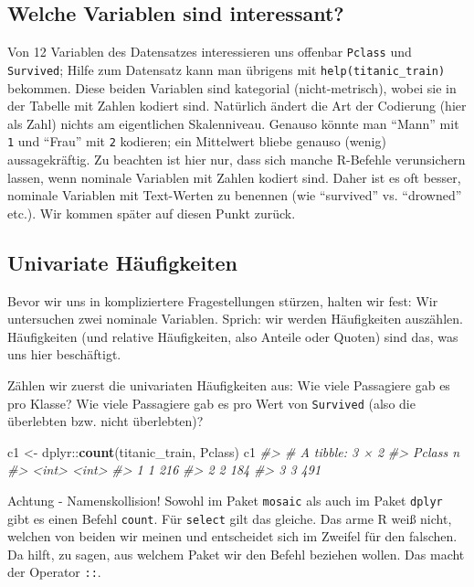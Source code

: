 \documentclass[12pt,ngerman,]{book}
\makeatletter
\newenvironment{Shaded}{\begin{snugshade}}{\end{snugshade}}
\newcommand{\KeywordTok}[1]{\textcolor[rgb]{0.13,0.29,0.53}{\textbf{{#1}}}}
\newcommand{\StringTok}[1]{\textcolor[rgb]{0.31,0.60,0.02}{{#1}}}
\newcommand{\CommentTok}[1]{\textcolor[rgb]{0.56,0.35,0.01}{\textit{{#1}}}}
\newcommand{\NormalTok}[1]{{#1}}
\newenvironment{kframe}{%
\medskip{}
\setlength{\fboxsep}{.8em}
 \def\at@end@of@kframe{}%
 \ifinner\ifhmode%
  \def\at@end@of@kframe{\end{minipage}}%
  \begin{minipage}{\columnwidth}%
 \fi\fi%
 \def\FrameCommand##1{\hskip\@totalleftmargin \hskip-\fboxsep
 \colorbox{shadecolor}{##1}\hskip-\fboxsep
     \hskip-\linewidth \hskip-\@totalleftmargin \hskip\columnwidth}%
 \MakeFramed {\advance\hsize-\width
   \@totalleftmargin\z@ \linewidth\hsize
   \@setminipage}}%
 {\par\unskip\endMakeFramed%
 \at@end@of@kframe}
\renewenvironment{Shaded}{\begin{kframe}}{\end{kframe}}
\let\BeginKnitrBlock\begin \let\EndKnitrBlock\end
\makeatother
\begin{document}
\subsection{Welche Variablen sind
interessant?}\label{welche-variablen-sind-interessant}

Von 12 Variablen des Datensatzes interessieren uns offenbar
\texttt{Pclass} und \texttt{Survived}; Hilfe zum Datensatz kann man
übrigens mit \texttt{help(titanic\_train)} bekommen. Diese beiden
Variablen sind kategorial (nicht-metrisch), wobei sie in der Tabelle mit
Zahlen kodiert sind. Natürlich ändert die Art der Codierung (hier als
Zahl) nichts am eigentlichen Skalenniveau. Genauso könnte man ``Mann''
mit \texttt{1} und ``Frau'' mit \texttt{2} kodieren; ein Mittelwert
bliebe genauso (wenig) aussagekräftig. Zu beachten ist hier nur, dass
sich manche R-Befehle verunsichern lassen, wenn nominale Variablen mit
Zahlen kodiert sind. Daher ist es oft besser, nominale Variablen mit
Text-Werten zu benennen (wie ``survived'' vs. ``drowned'' etc.). Wir
kommen später auf diesen Punkt zurück.

\subsection{Univariate Häufigkeiten}\label{univariate-haufigkeiten}

Bevor wir uns in kompliziertere Fragestellungen stürzen, halten wir
fest: Wir untersuchen zwei nominale Variablen. Sprich: wir werden
Häufigkeiten auszählen. Häufigkeiten (und relative Häufigkeiten, also
Anteile oder Quoten) sind das, was uns hier beschäftigt.

Zählen wir zuerst die univariaten Häufigkeiten aus: Wie viele Passagiere
gab es pro Klasse? Wie viele Passagiere gab es pro Wert von
\texttt{Survived} (also die überlebten bzw. nicht überlebten)?

\begin{Shaded}
\begin{Highlighting}[]
\NormalTok{c1 <-}\StringTok{ }\NormalTok{dplyr::}\KeywordTok{count}\NormalTok{(titanic_train, Pclass)}
\NormalTok{c1}
\CommentTok{#> # A tibble: 3 × 2}
\CommentTok{#>   Pclass     n}
\CommentTok{#>    <int> <int>}
\CommentTok{#> 1      1   216}
\CommentTok{#> 2      2   184}
\CommentTok{#> 3      3   491}
\end{Highlighting}
\end{Shaded}

\BeginKnitrBlock{rmdcaution}
Achtung - Namenskollision! Sowohl im Paket \texttt{mosaic} als auch im
Paket \texttt{dplyr} gibt es einen Befehl \texttt{count}. Für
\texttt{select} gilt das gleiche. Das arme R weiß nicht, welchen von
beiden wir meinen und entscheidet sich im Zweifel für den falschen. Da
hilft, zu sagen, aus welchem Paket wir den Befehl beziehen wollen. Das
macht der Operator \texttt{::}.
\EndKnitrBlock{rmdcaution}
\end{document}
